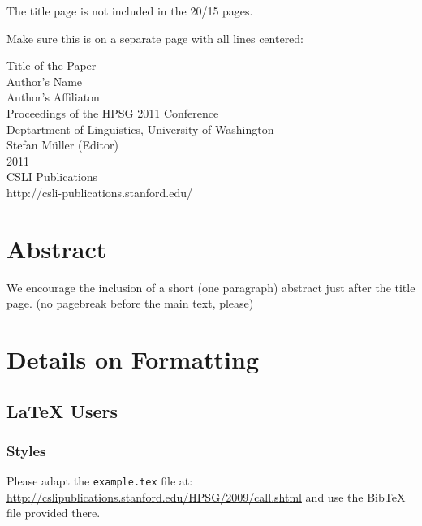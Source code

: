 \documentclass[11pt,a4paper,fleqn]{article}
\begin{document}
The title page is not included in the 20/15 pages.

Make sure this is on a separate page with all lines centered:

\begin{center}
\Large
Title of the Paper\\[\baselineskip]

Author's Name\\[\baselineskip]
Author's Affiliaton\\[3\baselineskip]

                Proceedings of the HPSG 2011 Conference\\[\baselineskip]

Deptartment of Linguistics, University of Washington\\[\baselineskip]

                        Stefan M{\"u}ller (Editor)\\[\baselineskip]

                                2011\\[\baselineskip]

                          CSLI Publications\\[\baselineskip]

              http://csli-publications.stanford.edu/

\end{center}

\section{Abstract}

We encourage the inclusion of a short (one paragraph)  abstract just after the title page.
(no pagebreak before the main text, please)


\section{Details on Formatting}

\subsection{\LaTeX{} Users}

\subsubsection{Styles}

Please adapt the \verb+example.tex+ file at:\newline
\url{http://cslipublications.stanford.edu/HPSG/2009/call.shtml}\newline
and use the BibTeX file provided there.
\end{document}
